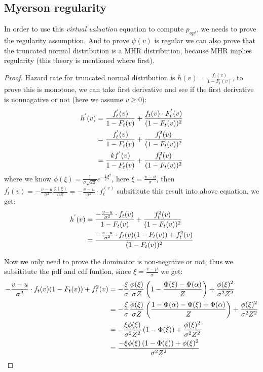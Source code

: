 \subsection{Myerson regularity}
In order to use this \textit{virtual valuation} equation to compute $p_{opt}$, we needs to prove the regularity assumption. And to prove $\psi(v)$ is regular we can also prove that the truncated normal distribution is a MHR distribution, because MHR implies regularity (this theory is mentioned where first). 

\begin{proof}
Hazard rate for truncated normal distribution is $h(v) = \frac{f_t(v)}{1 - F_t(v)}$, to prove this is monotone, we can take first derivative and see if the first derivative is nonnagative or not (here we assume $v \geqslant 0$):
\begin{equation}\notag
\begin{split}	
	h^{'}(v) &=\frac{f_t^{'}(v)}{1 - F_t(v)}  + \frac{f_t(v)\cdot F_t^{'} (v)}{(1 - F_t(v))^2}\\&= \frac{f_t^{'}(v)}{1 - F_t(v)}  + \frac{f_t^{2}(v)}{(1 - F_t(v))^2}\\&= \frac{kf^{'}(v)}{1 - F_t(v)}  + \frac{f_t^{2}(v)}{(1 - F_t(v))^2}
\end{split}
\end{equation} 
where we know $\phi(\xi) = \frac{1}{\sigma \sqrt{2\pi}} e^{-\frac{1}{2}\xi^2}$, here $\xi = \frac{v-u}{\sigma}$, then $f_t^{'}(v) = -\frac{v-u}{\sigma^2} \frac{\phi(\xi)}{\sigma Z}= -\frac{v-u}{\sigma^2}\cdot f_t^(v) $ subsititute this result into above equation, we get:
\begin{equation}\notag
\begin{split}	
h^{'}(v) &=\frac{-\frac{v-u}{\sigma^2}\cdot f_t(v)}{1 - F_t(v)}  + \frac{f_t^{2}(v)}{(1 - F_t(v))^2}\\&= \frac{-\frac{v-u}{\sigma^2}\cdot f_t(v)(1 - F_t(v)) + f_t^{2}(v)}{(1 - F_t(v))^2}
\end{split}
\end{equation} 

Now we only need to prove the dominator is non-negative or not, thus we subsititute the pdf and cdf funtion, since $\xi = \frac{v-\mu}{\sigma}$ we get:
\begin{equation}\notag
	\begin{split}	
		-\frac{v-u}{\sigma^2}\cdot f_t(v)(1 - F_t(v)) + f_t^{2}(v) &=-\frac{\xi}{\sigma}\frac{\phi(\xi)}{\sigma Z}\left(1 -  \frac{\Phi(\xi) - \Phi(\alpha)}{Z} \right) + \frac{\phi(\xi)^2}{\sigma^2 Z^2}\\&= -\frac{\xi}{\sigma}\frac{\phi(\xi)}{\sigma Z}\left( \frac{1 - \Phi(\alpha) - \Phi(\xi) + \Phi(\alpha)}{Z} \right) + \frac{\phi(\xi)^2}{\sigma^2 Z^2}\\&=-\frac{\xi\phi(\xi)}{\sigma^2 Z^2}\left( 1 - \Phi(\xi) \right)+ \frac{\phi(\xi)^2}{\sigma^2 Z^2}\\&=\frac{-\xi\phi(\xi)\left( 1 - \Phi(\xi) \right) + \phi(\xi)^2}{\sigma^2 Z^2} 
	\end{split}
\end{equation} 


\end{proof}
